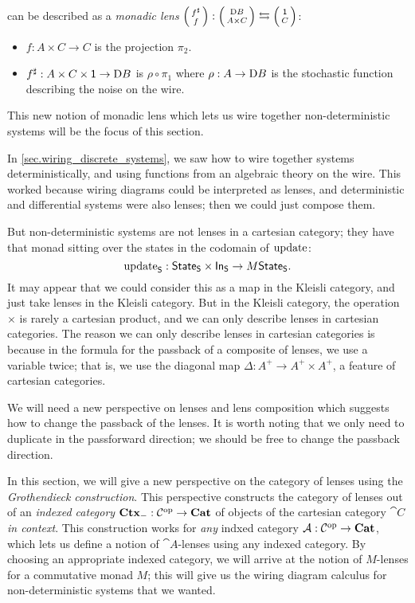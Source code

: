 \documentclass[DynamicalBook]{subfiles}
\begin{document}
can be described as a \emph{monadic lens} $\lens{f^{\sharp}}{f} : \lens{\probset B}{A
  \times C} \fromto \lens{\ord{1}}{C}$:
\begin{itemize}
\item $f : A \times C \to C$ is the projection $\pi_2$.
\item $f^{\sharp}: A \times C \times \mathsf{1} \to \mathrm{D} B$ is $\rho \circ \pi_1$ where $\rho : A \to
  \mathrm{D} B$ is the stochastic function describing the noise on the wire.
\end{itemize}
This new notion of monadic lens which lets us wire together non-deterministic
systems will be the focus of this section.

In \cref{sec.wiring_discrete_systems}, we saw how to wire together systems
deterministically, and using functions from an algebraic theory on the wire. This
worked because wiring diagrams could be interpreted as lenses, and deterministic
and differential systems were also lenses; then we could just compose them.

But non-deterministic systems are not lenses in a cartesian category; they have
that monad sitting over the states in the codomain of $\mathrm{update}_{\mathsf{}}$:
\[
\mathrm{update}_{\mathsf{S}} : \mathsf{State}_{\mathsf{S}} \times \mathsf{In}_{\mathsf{S}} \to M \mathsf{State}_{\mathsf{S}}.
\]
It may appear that we could consider this as a map in the Kleisli category, and
just take lenses in the Kleisli category. But in the Kleisli category, the
operation $\times$ is rarely a cartesian product, and we can only describe
lenses in cartesian categories. The reason we can only describe lenses in
cartesian categories is because in the formula for the passback of a composite
of lenses, we use a variable twice; that is, we use the diagonal map $\Delta : A^+ \to
A^+ \times A^+$, a feature of cartesian categories. 


We will need a new perspective on lenses and
lens composition which suggests how to change the passback of the lenses. It is
worth noting that we only need to duplicate in the passforward direction; we
should be free to change the passback direction.

In this section, we will give a new perspective on the category of lenses using
the \emph{Grothendieck construction}. This perspective constructs the category
of lenses out of an \emph{indexed category} $\textbf{Ctx}_{-} : \mathcal{C}^{\textnormal{op}} \to
\textbf{Cat}$ of objects of the cartesian category $\cat{C}$ \emph{in context}.
This construction works for \emph{any} indxed category $\mathcal{A} : \mathcal{C}^{\textnormal{op}} \to
\textbf{Cat}$, which lets us define a notion of $\cat{A}$-lenses using any indexed
category. By choosing an appropriate indexed category, we will arrive at the
notion of $M$-lenses for a commutative monad $M$; this will give us the wiring
diagram calculus for non-deterministic systems that we wanted.
\end{document}
